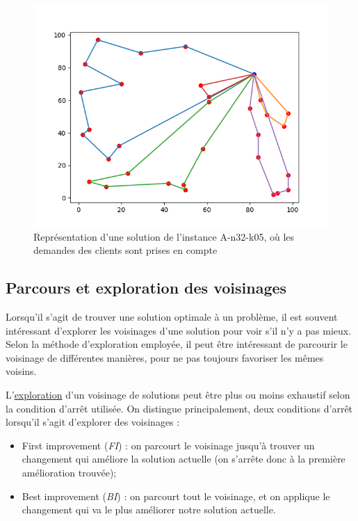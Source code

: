 \documentclass[a4paper,11pt]{article}%
\begin{document}
\begin{figure}
\centering
\includegraphics[scale=0.5]{solutionCapacity.png}
\caption{Représentation d'une solution de l'instance A-n32-k05, où les demandes des clients sont prises en compte}
\label{SC3205}
\end{figure}

\subsection{Parcours et exploration des voisinages}
\label{voisinage}

Lorsqu'il s'agit de trouver une solution optimale à un problème, il est souvent intéressant d'explorer les voisinages d'une solution pour voir s'il n'y a pas mieux. Selon la méthode d'exploration employée, il peut être intéressant de parcourir le voisinage de différentes manières, pour ne pas toujours favoriser les mêmes voisins.

L'\underline{exploration} d'un voisinage de solutions peut être plus ou moins exhaustif selon la condition d'arrêt utilisée.
On distingue principalement, deux conditions d'arrêt lorsqu'il s'agit d'explorer des voisinages :

\begin{itemize}
\item First improvement (\emph{FI}) : on parcourt le voisinage jusqu'à trouver un changement qui améliore la solution actuelle (on s'arrête donc à la première amélioration trouvée);
\item Best improvement (\emph{BI}) : on parcourt tout le voisinage, et on applique le changement qui va le plus améliorer notre solution actuelle. \\
\end{itemize}
\end{document}
